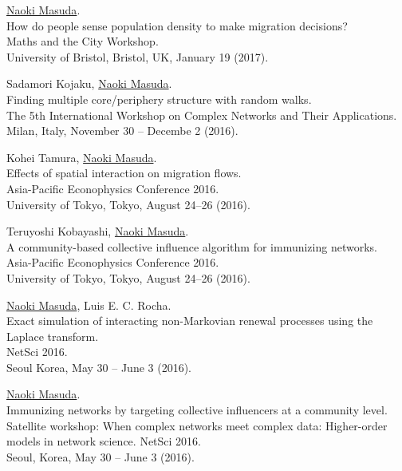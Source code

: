 \documentclass[11pt,letter]{article}
\begin{document}
\begin{etaremune}
\item \underline{Naoki Masuda}.\\
How do people sense population density to make migration decisions?\\
Maths and the City Workshop.\\
University of Bristol, Bristol, UK, January 19 (2017).

\item Sadamori Kojaku, \underline{Naoki Masuda}.\\
Finding multiple core/periphery structure with random walks.\\
The 5th International Workshop on Complex Networks and Their Applications.\\
Milan, Italy, November 30 -- Decembe 2 (2016).

\item Kohei Tamura, \underline{Naoki Masuda}.\\
Effects of spatial interaction on migration flows.\\
Asia-Pacific Econophysics Conference 2016.\\
University of Tokyo, Tokyo, August 24--26 (2016).

\item Teruyoshi Kobayashi, \underline{Naoki Masuda}.\\
A community-based collective influence algorithm for immunizing networks.\\
Asia-Pacific Econophysics Conference 2016.\\
University of Tokyo, Tokyo, August 24--26 (2016).

\item \underline{Naoki Masuda}, Luis E. C. Rocha.\\
Exact simulation of interacting non-Markovian renewal processes using the Laplace transform.\\
NetSci 2016.\\
Seoul Korea, May 30 -- June 3 (2016).

\item \underline{Naoki Masuda}.\\
Immunizing networks by targeting collective influencers at a community level.\\
Satellite workshop: When complex networks meet complex data: Higher-order models in network science. NetSci 2016.\\
Seoul, Korea, May 30 -- June 3 (2016).


\end{etaremune}
\end{document}

